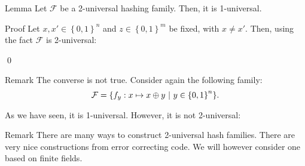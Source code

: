 \documentclass[a4paper]{article}
\begin{document}
\begin{parag}{Lemma}
    Let $\mathcal{F}$ be a 2-universal hashing family. Then, it is 1-universal.

    \begin{subparag}{Proof}
        Let $x, x' \in \left\{0, 1\right\}^n$ and $z \in \left\{0, 1\right\}^m$ be fixed, with $x \neq x'$. Then, using the fact $\mathcal{F}$ is 2-universal: 
        
        \qed
    \end{subparag}

    \begin{subparag}{Remark}
        The converse is not true. Consider again the following family: 
        \[\mathcal{F} = \left\{f_y: x \mapsto x \oplus y \suchthat y \in \left\{0, 1\right\}^n\right\}.\]
        
        As we have seen, it is 1-universal. However, it is not 2-universal: 
    \end{subparag} 
\end{parag}

\begin{parag}{Remark}
    There are many ways to construct 2-universal hash families. There are very nice constructions from error correcting code. We will however consider one based on finite fields.
\end{parag}
\end{document}
